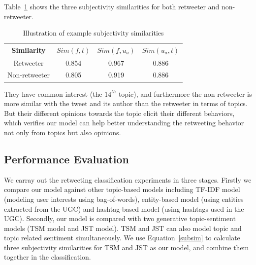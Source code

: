 \documentclass[letterpaper]{article}
\begin{document}
Table~\ref{tab4} shows the three subjectivity similarities for both retweeter and non-retweeter. 
\begin{table}[h]
\scriptsize
\centering
\caption{ Illustration of example subjectivity similarities}
\label{tab4}
\begin{tabular}{|c|c|c|c|}
\hline
Similarity & $ Sim(f,t) $ & $ Sim(f,u_a)  $ & $ Sim(u_a,t)  $\\
\hline
Retweeter & 0.854 & 0.967 & 0.886\\
\hline
Non-retweeter & 0.805 & 0.919 & 0.886\\
\hline
\end{tabular}
\end{table} 
They have common interest (the $ 14^{th} $ topic), and furthermore the non-retweeter is more similar with the tweet and its author than the retweeter in terms of topics. But their different opinions towards the topic elicit their different behaviors, which verifies our model can help better understanding the retweeting behavior not only from topics but also opinions.

\subsection{Performance Evaluation}

We carray out the retweeting classification experiments in three stages. Firstly we compare our model against other topic-based models including TF-IDF model (modeling user interests using bag-of-words), entity-based model (using entities extracted from the UGC) and hashtag-based model (using hashtags used in the UGC)\cite{abel2011analyzing}.
Secondly, our model is compared with two generative topic-sentiment models (TSM model\cite{mei2007topic} and JST model\cite{lin2009joint}). TSM and JST can also model topic and topic related sentiment simultaneously. We use Equation~\ref{subsim} to calculate three  subjectivity similarities for TSM and JST as our model, and combine them together in the classification.
\end{document}
